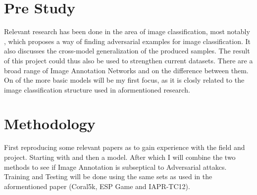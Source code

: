 \documentclass[12pt]{extarticle}
\begin{document}
\section{Pre Study}
Relevant research has been done in the area of image classification, most notably \cite[Intriguing properties of neural networks]{szegedy2014intriguing}, which proposes a way of finding adversarial examples for image classification. It also discusses the cross-model generalization of the produced samples. The result of this project could thus also be used to strengthen current datasets.
There are a broad range of Image Annotation Networks and \cite[surveys]{cheng_zhang_fu_tu_li_2018} on the difference between them. On of the more basic \cite[deep learning image annotation]{venkatesh} models will be my first focus, as it is closly related to the image classification structure used in aformentioned research.

\section{Methodology}
First reproducing some relevant papers as to gain experience with the field and project. Starting with \cite[Intriguing properties of neural networks]{szegedy2014intriguing} and then a \cite[deep learning image annotation]{venkatesh} model. After which I will combine the two methods to see if Image Annotation is subseptical to Adversarial attakcs.
Training and Testing will be done using the same sets as used in the aformentioned paper (Coral5k, ESP Game and  IAPR-TC12).
\end{document}
